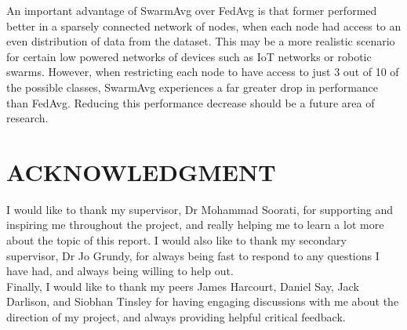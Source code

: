 \documentclass[letterpaper, 10 pt, conference]{ieeeconf}  %
\begin{document}
An important advantage of SwarmAvg over FedAvg is that former performed better in a sparsely connected network of nodes, when each node had access to an even distribution of data from the dataset. This may be a more realistic scenario for certain low powered networks of devices such as IoT networks or robotic swarms. However, when restricting each node to have access to just 3 out of 10 of the possible classes, SwarmAvg experiences a far greater drop in performance than FedAvg. Reducing this performance decrease should be a future area of research.

\addtolength{\textheight}{-12cm}   %








\section*{ACKNOWLEDGMENT}

I would like to thank my supervisor, Dr Mohammad Soorati, for supporting and inspiring me throughout the project, and really helping me to learn a lot more about the topic of this report. I would also like to thank my secondary supervisor, Dr Jo Grundy, for always being fast to respond to any questions I have had, and always being willing to help out.\\

Finally, I would like to thank my peers James Harcourt, Daniel Say, Jack Darlison, and Siobhan Tinsley for having engaging discussions with me about the direction of my project, and always providing helpful critical feedback.






{}
\end{document}
